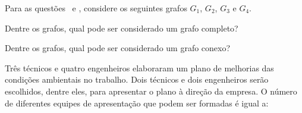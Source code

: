 \documentclass[16pt]{examdesign}
\begin{document}
\begin{multiplechoice}[title={Questões de múltipla escolha (3 pontos cada) },rearrange=no, resetcounter=no,suppressprefix,examcolumns=2,keycolumns=2]
\begin{question}
  \end{question}
 
  

    \begin{block}[questions=2]
  \columnbreak

  Para as questões \thefirst\ e \thelast, considere os seguintes grafos $G_1$, $G_2$, $G_3$ e $G_4$.
  
  
 

    \begin{question}
      Dentre os grafos, qual pode ser considerado um grafo completo? 
      
    \end{question}      
    \begin{question}
      Dentre os grafos, qual pode ser considerado um grafo conexo?
    \end{question}
        
  \end{block}
   \begin{question}
   Três técnicos e quatro engenheiros elaboraram um plano de melhorias das condições ambientais no trabalho. Dois técnicos e dois engenheiros serão escolhidos, dentre eles, para apresentar o plano à direção da empresa. O número de diferentes equipes de apresentação que podem ser formadas é igual a:

  
	
		
  \end{question}

\end{multiplechoice}
\end{document}
